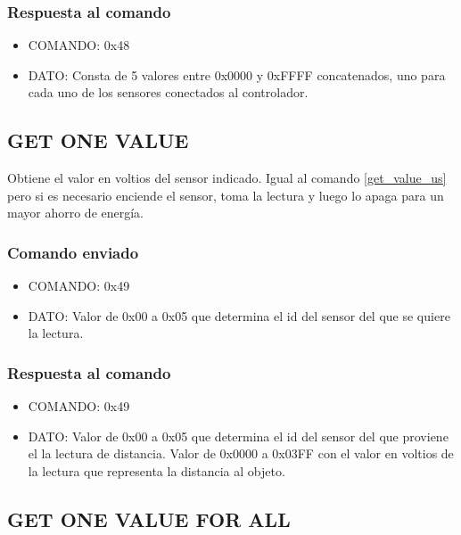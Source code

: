 \documentclass[a4paper,10pt]{article}
\begin{document}
\subsubsection*{Respuesta al comando}

\begin{itemize}
	\item{COMANDO:} 0x48
	\item{DATO:} Consta de 5 valores entre 0x0000 y 0xFFFF concatenados, uno para cada uno de los sensores conectados al controlador.
\end{itemize}

\subsection{GET ONE VALUE}
\label{get_one_value_us}

Obtiene el valor en voltios del sensor indicado.
Igual al comando \ref{get_value_us} pero si es necesario enciende el sensor, toma la lectura y luego lo apaga para un mayor ahorro de energ\'ia.

\subsubsection*{Comando enviado}

\begin{itemize}
	\item{COMANDO:} 0x49
	\item{DATO:} Valor de 0x00 a 0x05 que determina el id del sensor del que se quiere la lectura.
\end{itemize}

\subsubsection*{Respuesta al comando}

\begin{itemize}
	\item{COMANDO:} 0x49
	\item{DATO:} Valor de 0x00 a 0x05 que determina el id del sensor del que proviene el la lectura de distancia.
	Valor de 0x0000 a 0x03FF con el valor en voltios de la lectura que representa la distancia al objeto.
\end{itemize}

\subsection{GET ONE VALUE FOR ALL}
\label{get_one_values_for_all_us}
\end{document}
